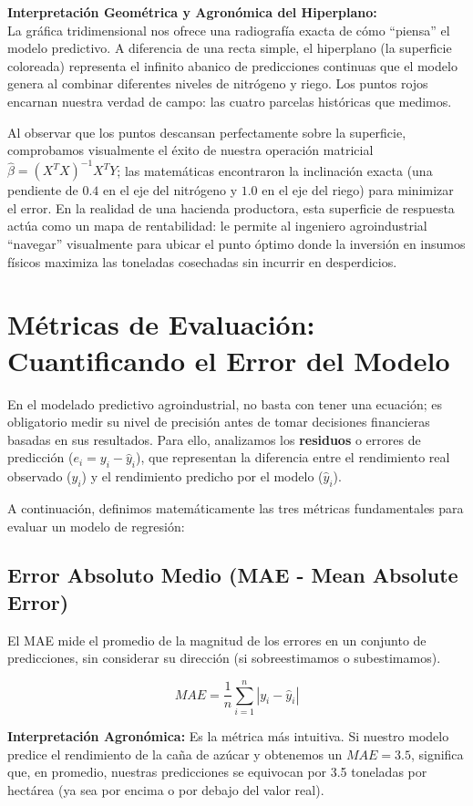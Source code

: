 \documentclass{article}
\begin{document}
\textbf{Interpretación Geométrica y Agronómica del Hiperplano:} \\
La gráfica tridimensional nos ofrece una radiografía exacta de cómo ``piensa'' el modelo predictivo. A diferencia de una recta simple, el hiperplano (la superficie coloreada) representa el infinito abanico de predicciones continuas que el modelo genera al combinar diferentes niveles de nitrógeno y riego. Los puntos rojos encarnan nuestra verdad de campo: las cuatro parcelas históricas que medimos. 

Al observar que los puntos descansan perfectamente sobre la superficie, comprobamos visualmente el éxito de nuestra operación matricial $\hat{\beta} = (X^T X)^{-1} X^T Y$; las matemáticas encontraron la inclinación exacta (una pendiente de $0.4$ en el eje del nitrógeno y $1.0$ en el eje del riego) para minimizar el error. En la realidad de una hacienda productora, esta superficie de respuesta actúa como un mapa de rentabilidad: le permite al ingeniero agroindustrial ``navegar'' visualmente para ubicar el punto óptimo donde la inversión en insumos físicos maximiza las toneladas cosechadas sin incurrir en desperdicios.

\section{Métricas de Evaluación: Cuantificando el Error del Modelo}

En el modelado predictivo agroindustrial, no basta con tener una ecuación; es obligatorio medir su nivel de precisión antes de tomar decisiones financieras basadas en sus resultados. Para ello, analizamos los \textbf{residuos} o errores de predicción ($e_i = y_i - \hat{y}_i$), que representan la diferencia entre el rendimiento real observado ($y_i$) y el rendimiento predicho por el modelo ($\hat{y}_i$).

A continuación, definimos matemáticamente las tres métricas fundamentales para evaluar un modelo de regresión:

\subsection{Error Absoluto Medio (MAE - Mean Absolute Error)}
El MAE mide el promedio de la magnitud de los errores en un conjunto de predicciones, sin considerar su dirección (si sobreestimamos o subestimamos). 

$$ MAE = \frac{1}{n} \sum_{i=1}^{n} |y_i - \hat{y}_i| $$

\textbf{Interpretación Agronómica:} Es la métrica más intuitiva. Si nuestro modelo predice el rendimiento de la caña de azúcar y obtenemos un $MAE = 3.5$, significa que, en promedio, nuestras predicciones se equivocan por 3.5 toneladas por hectárea (ya sea por encima o por debajo del valor real).
\end{document}
